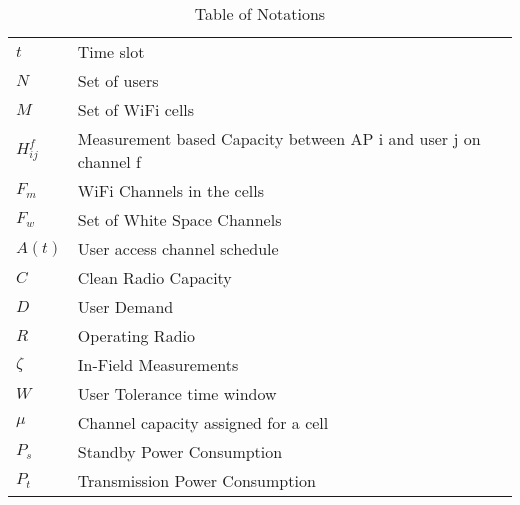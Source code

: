\begin{table}[htbp]
\begin{center}%
\begin{tabular}{l l p{10cm} }
\toprule
$t$ & Time slot\\
$N$ & Set of users\\
$M$ & Set of WiFi cells\\
$H_{ij}^f$ & Measurement based Capacity between AP i and user j on channel f\\
$F_{m}$ & WiFi Channels in the cells\\
$F_{w}$ & Set of White Space Channels\\
$A(t)$ & User access channel schedule\\
$C$ & Clean Radio Capacity\\
$D$ & User Demand\\
$R$ & Operating Radio\\
$\zeta$ & In-Field Measurements\\
$W$ & User Tolerance time window \\
$\mu$ & Channel capacity assigned for a cell \\
$P_s$ & Standby Power Consumption \\
$P_t$ & Transmission Power Consumption \\
\bottomrule
\end{tabular}
\end{center}
\caption{Table of Notations}
\label{tab:notation}
\vspace{-0.3in}
\end{table}
